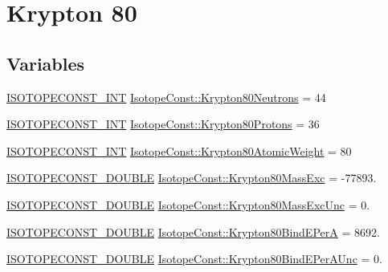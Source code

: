 \hypertarget{group___isotope_const-_krypton-_kr80}{}\section{Krypton 80}
\label{group___isotope_const-_krypton-_kr80}
\subsection*{Variables}
\begin{DoxyCompactItemize}
\item 
\mbox{\hyperlink{group___isotope_const-_macros_ga5f18360b3e99483a35c32d789e62621c}{I\+S\+O\+T\+O\+P\+E\+C\+O\+N\+S\+T\+\_\+\+I\+NT}} \mbox{\hyperlink{group___isotope_const-_krypton-_kr80_gaa67249f1bc6bf095c41e41ea31afff0a}{Isotope\+Const\+::\+Krypton80\+Neutrons}} = 44
\item 
\mbox{\hyperlink{group___isotope_const-_macros_ga5f18360b3e99483a35c32d789e62621c}{I\+S\+O\+T\+O\+P\+E\+C\+O\+N\+S\+T\+\_\+\+I\+NT}} \mbox{\hyperlink{group___isotope_const-_krypton-_kr80_ga072da453dd6d92b810cc6cfbbd4df818}{Isotope\+Const\+::\+Krypton80\+Protons}} = 36
\item 
\mbox{\hyperlink{group___isotope_const-_macros_ga5f18360b3e99483a35c32d789e62621c}{I\+S\+O\+T\+O\+P\+E\+C\+O\+N\+S\+T\+\_\+\+I\+NT}} \mbox{\hyperlink{group___isotope_const-_krypton-_kr80_ga0c8d829fdd17752de7139b04172f42c3}{Isotope\+Const\+::\+Krypton80\+Atomic\+Weight}} = 80
\item 
\mbox{\hyperlink{group___isotope_const-_macros_ga8f45a7272ce02c0b4c65c44636ed719a}{I\+S\+O\+T\+O\+P\+E\+C\+O\+N\+S\+T\+\_\+\+D\+O\+U\+B\+LE}} \mbox{\hyperlink{group___isotope_const-_krypton-_kr80_ga494536f04d98ee39ace8985e76822139}{Isotope\+Const\+::\+Krypton80\+Mass\+Exc}} = -\/77893.
\item 
\mbox{\hyperlink{group___isotope_const-_macros_ga8f45a7272ce02c0b4c65c44636ed719a}{I\+S\+O\+T\+O\+P\+E\+C\+O\+N\+S\+T\+\_\+\+D\+O\+U\+B\+LE}} \mbox{\hyperlink{group___isotope_const-_krypton-_kr80_gaf129070edbae39637fdce2b364731877}{Isotope\+Const\+::\+Krypton80\+Mass\+Exc\+Unc}} = 0.
\item 
\mbox{\hyperlink{group___isotope_const-_macros_ga8f45a7272ce02c0b4c65c44636ed719a}{I\+S\+O\+T\+O\+P\+E\+C\+O\+N\+S\+T\+\_\+\+D\+O\+U\+B\+LE}} \mbox{\hyperlink{group___isotope_const-_krypton-_kr80_gace7628ed246e3295c91b3daebafbd9e5}{Isotope\+Const\+::\+Krypton80\+Bind\+E\+PerA}} = 8692.
\item 
\mbox{\hyperlink{group___isotope_const-_macros_ga8f45a7272ce02c0b4c65c44636ed719a}{I\+S\+O\+T\+O\+P\+E\+C\+O\+N\+S\+T\+\_\+\+D\+O\+U\+B\+LE}} \mbox{\hyperlink{group___isotope_const-_krypton-_kr80_ga4daa98720126f52fbbf8edf67ccccd46}{Isotope\+Const\+::\+Krypton80\+Bind\+E\+Per\+A\+Unc}} = 0.

\end{DoxyCompactItemize}

